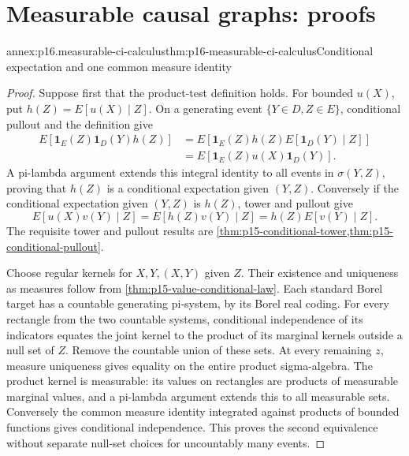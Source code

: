 \section{Measurable causal graphs: proofs}
\label{sec:annex-p16-measurable-causal-graphs}

\begin{annexitem}{annex:p16.measurable-ci-calculus}{thm:p16-measurable-ci-calculus}{Conditional expectation and one common measure identity}
\begin{proof}
Suppose first that the product-test definition holds. For bounded
\(u(X)\), put \(h(Z)=E[u(X)\mid Z]\). On a generating event
\(\{Y\in D,Z\in E\}\), conditional pullout and the definition give
\[
\begin{aligned}
 E[\mathbf1_E(Z)\mathbf1_D(Y)h(Z)]
 &=E[\mathbf1_E(Z)h(Z)E[\mathbf1_D(Y)\mid Z]]\\
 &=E[\mathbf1_E(Z)u(X)\mathbf1_D(Y)].
\end{aligned}
\]
A pi-lambda argument extends this integral identity to all events in
\(\sigma(Y,Z)\), proving that \(h(Z)\) is a conditional expectation
given \((Y,Z)\). Conversely if the conditional expectation given
\((Y,Z)\) is \(h(Z)\), tower and pullout give
\[
 E[u(X)v(Y)\mid Z]
 =E[h(Z)v(Y)\mid Z]=h(Z)E[v(Y)\mid Z].
\]
The requisite tower and pullout results are
\cref{thm:p15-conditional-tower,thm:p15-conditional-pullout}.

Choose regular kernels for \(X,Y,(X,Y)\) given \(Z\). Their existence
and uniqueness as measures follow from
\cref{thm:p15-value-conditional-law}. Each standard Borel target has
a countable generating pi-system, by its Borel real coding. For every
rectangle from the two countable systems, conditional independence of
its indicators equates the joint kernel to the product of its marginal
kernels outside a null set of \(Z\). Remove the countable union of these
sets. At every remaining \(z\), measure uniqueness gives equality on
the entire product sigma-algebra. The product kernel is measurable:
its values on rectangles are products of measurable marginal values,
and a pi-lambda argument extends this to all measurable sets. Conversely
the common measure identity integrated against products of bounded
functions gives conditional independence. This proves the second
equivalence without separate null-set choices for uncountably many events.


\end{proof}
\end{annexitem}
